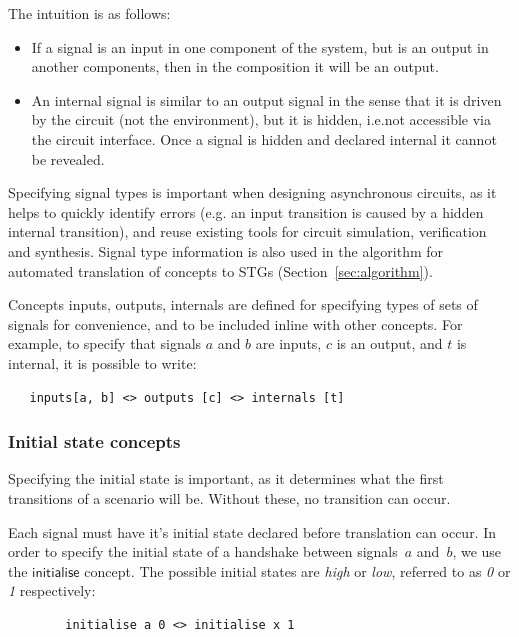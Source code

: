 \documentclass[british,conference,compsoc]{IEEEtran}
\begin{document}
The intuition is as follows:
\begin{itemize}
    \item If a signal is an input in one component of the system, but is an
    output in another components, then in the composition it will be an output.
    \item An internal signal is similar to an output signal in the sense
that it is driven by the circuit (not the environment), but it is hidden, 
i.e.not accessible via the circuit interface. Once a signal is hidden and 
declared internal it cannot be revealed.
\end{itemize}

\noindent Specifying signal types is important when designing asynchronous
circuits, as it helps to quickly identify errors (e.g. an input transition is
caused by a hidden internal transition), and reuse existing tools for circuit
simulation, verification and synthesis. Signal type information is also used
in the algorithm for automated translation of concepts to
STGs (Section~\ref{sec:algorithm}).

Concepts \textsf{inputs}, \textsf{outputs}, \textsf{internals} are defined for
specifying types of sets of signals for convenience, and to be included inline 
with other concepts. For example, to specify that signals $a$ and $b$ are 
inputs, $c$ is an output, and $t$ is internal, it is possible to write:

\begin{lstlisting}
   inputs[a, b] <> outputs [c] <> internals [t]
\end{lstlisting}

\vspace{-4mm}

\subsubsection{Initial state concepts\label{sub:initState}}

Specifying the initial state is important, as it determines what the first 
transitions of a scenario will be. Without these, no transition can occur.

Each signal must have it's initial state declared before translation can occur. 
In order to specify the initial state of a handshake between signals~$a$
and~$b$, we use the $\mathsf{initialise}$ concept.
The possible initial states are \emph{high} or \emph{low}, referred to as 
\emph{0} or \emph{1} respectively:

\begin{lstlisting}
        initialise a 0 <> initialise x 1
\end{lstlisting}
\end{document}
